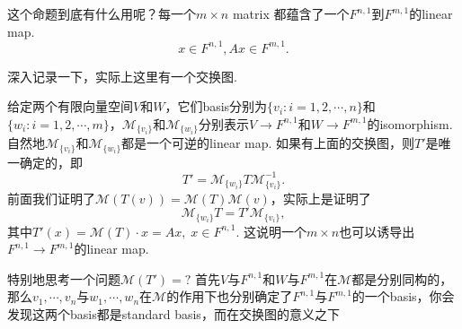 \documentclass{article}
\begin{document}
这个命题到底有什么用呢？{\color{blue}每一个$m \times n$ matrix 都蕴含了一个$F^{n,1}$到$F^{m,1}$的linear map}.
$$
x \in F^{n,1} , Ax \in F^{m,1}.
$$

深入记录一下，实际上这里有一个交换图.
\begin{center}
\end{center}
给定两个有限向量空间$V$和$W$，它们basis分别为$\{v_i : i =1,2,\cdots,n\}$和$\{w_i: i = 1,2,\cdots,m\}$，$\mathcal{M}_{\{v_i\}}$和$\mathcal{M}_{\{w_i\}}$分别表示$V \rightarrow F^{n,1}$和$W \rightarrow F^{m,1}$的isomorphism. 自然地$\mathcal{M}_{\{v_i\}}$和$\mathcal{M}_{\{w_i\}}$都是一个可逆的linear map. 如果有上面的交换图，则$T'$是唯一确定的，即
$$
T' = \mathcal{M}_{\{w_i\}}T\mathcal{M}^{-1}_{\{v_i\}}.
$$
前面我们证明了$\mathcal{M}(T(v)) = \mathcal{M}(T)\mathcal{M}(v)$，实际上是证明了
$$
\mathcal{M}_{\{w_i\}}T = T'\mathcal{M}_{\{v_i\}},
$$
其中$T'(x)= \mathcal{M}(T)\cdot x = Ax,\; x \in F^{n,1}$. 这说明一个$m \times n$也可以诱导出$F^{n,1} \rightarrow F^{m,1}$的linear map.

特别地思考一个问题$\mathcal{M}(T') = ?$ 首先$V$与$F^{n,1}$和$W$与$F^{m,1}$在$\mathcal{M}$都是分别同构的，那么$v_1,\cdots,v_n$与$w_1,\cdots,w_n$在$\mathcal{M}$的作用下也分别确定了$F^{n,1}$与$F^{m,1}$的一个basis，你会发现这两个basis都是standard basis，而在交换图的意义之下
\end{document}

